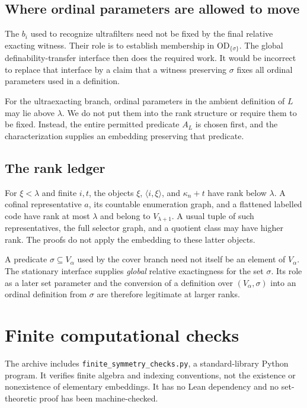 \documentclass[11pt,letterpaper]{article}
\theoremstyle{definition}
\newcommand{\OD}{\mathrm{OD}}
\begin{document}
\subsection{Where ordinal parameters are allowed to move}

The $b_i$ used to recognize ultrafilters need not be fixed by the final relative exacting witness. Their role is to establish membership in $\OD_{\{\sigma\}}$. The global definability-transfer interface then does the required work. It would be incorrect to replace that interface by a claim that a witness preserving $\sigma$ fixes all ordinal parameters used in a definition.

For the ultraexacting branch, ordinal parameters in the ambient definition of $L$ may lie above $\lambda$. We do not put them into the rank structure or require them to be fixed. Instead, the entire permitted predicate $A_L$ is chosen first, and the characterization supplies an embedding preserving that predicate.

\subsection{The rank ledger}

For $\xi<\lambda$ and finite $i,t$, the objects $\xi$, $\langle i,\xi\rangle$, and $\kappa_n+t$ have rank below $\lambda$. A cofinal representative $a$, its countable enumeration graph, and a flattened labelled code have rank at most $\lambda$ and belong to $V_{\lambda+1}$. A usual tuple of such representatives, the full selector graph, and a quotient class may have higher rank. The proofs do not apply the embedding to these latter objects.

A predicate $\sigma\subseteq V_\alpha$ used by the cover branch need not itself be an element of $V_\alpha$. The stationary interface supplies \emph{global} relative exactingness for the set $\sigma$. Its role as a later set parameter and the conversion of a definition over $(V_\alpha,\sigma)$ into an ordinal definition from $\sigma$ are therefore legitimate at larger ranks.

\section{Finite computational checks}\label{app:checks}

The archive includes \nolinkurl{finite_symmetry_checks.py}, a standard-library Python program. It verifies finite algebra and indexing conventions, not the existence or nonexistence of elementary embeddings. It has no Lean dependency and no set-theoretic proof has been machine-checked.
\end{document}
